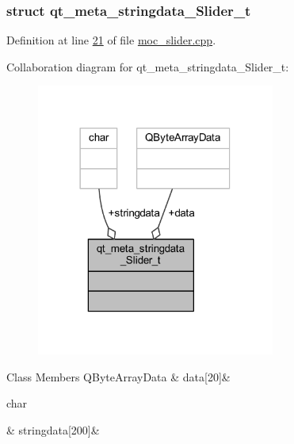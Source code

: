 \subsubsection{struct qt\+\_\+meta\+\_\+stringdata\+\_\+\+Slider\+\_\+t}


Definition at line \hyperlink{a00019_source_l00021}{21} of file \hyperlink{a00019_source}{moc\+\_\+slider.\+cpp}.



Collaboration diagram for qt\+\_\+meta\+\_\+stringdata\+\_\+\+Slider\+\_\+t\+:
\nopagebreak
\begin{figure}[H]
\begin{center}
\leavevmode
\includegraphics[width=222pt]{dd/df4/a00193}
\end{center}
\end{figure}
\begin{DoxyFields}{Class Members}
\hypertarget{a00019_a28e23ecab9373bb818a81f9a092a52de}{Q\+Byte\+Array\+Data}\label{a00019_a28e23ecab9373bb818a81f9a092a52de}
&
data\mbox{[}20\mbox{]}&
\\
\hline

\hypertarget{a00019_aa9f32a65077d2d4f1c99ac3536a308da}{char}\label{a00019_aa9f32a65077d2d4f1c99ac3536a308da}
&
stringdata\mbox{[}200\mbox{]}&
\\
\hline

\end{DoxyFields}


